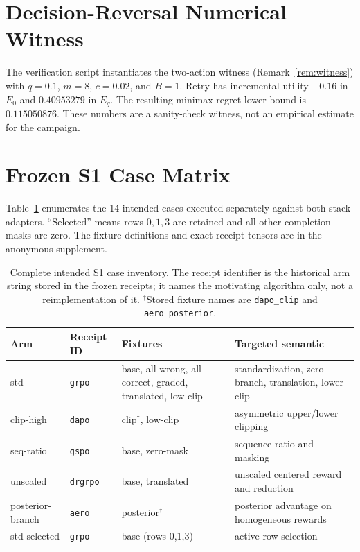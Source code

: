 \documentclass{article}
\begin{document}
\section{Decision-Reversal Numerical Witness}

The verification script instantiates the two-action witness
(Remark~\ref{rem:witness}) with $q=0.1$, $m=8$,
$c=0.02$, and $B=1$.  Retry has incremental utility $-0.16$ in $E_0$ and
$0.40953279$ in $E_q$.  The resulting minimax-regret lower bound is
$0.115050876$.  These numbers are a sanity-check witness, not an empirical
estimate for the campaign.

\section{Frozen S1 Case Matrix}
\label{app:cases}

Table~\ref{tab:s1-cases} enumerates the 14 intended cases executed separately
against both stack adapters.  ``Selected'' means rows $0,1,3$ are retained and
all other completion masks are zero.  The fixture definitions and exact receipt tensors
are in the anonymous supplement.

\begin{table}[h]
  \centering
  \caption{Complete intended S1 case inventory.  The receipt identifier is the
  historical arm string stored in the frozen receipts; it names the
  motivating algorithm only, not a reimplementation of it.  $^{\dagger}$Stored
  fixture names are \texttt{dapo\_clip} and \texttt{aero\_posterior}.}
  \label{tab:s1-cases}
  \small
  \begin{tabularx}{\linewidth}{llXl}
    \toprule
    Arm & Receipt ID & Fixtures & Targeted semantic \\
    \midrule
    std & \texttt{grpo} & base, all-wrong, all-correct, graded, translated, low-clip
      & standardization, zero branch, translation, lower clip \\
    clip-high & \texttt{dapo} & clip$^{\dagger}$, low-clip & asymmetric upper/lower clipping \\
    seq-ratio & \texttt{gspo} & base, zero-mask & sequence ratio and masking \\
    unscaled & \texttt{drgrpo} & base, translated & unscaled centered reward and reduction \\
    posterior-branch & \texttt{aero} & posterior$^{\dagger}$ & posterior advantage on homogeneous rewards \\
    std selected & \texttt{grpo} & base (rows 0,1,3) & active-row selection \\
    \bottomrule
  \end{tabularx}
\end{table}
\end{document}
